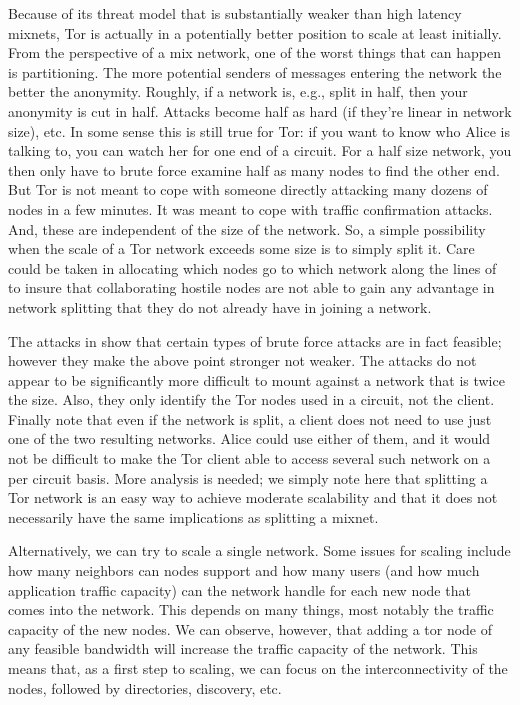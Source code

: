 \documentclass{llncs}
\begin{document}
Because of its threat model that is substantially weaker than high
latency mixnets, Tor is actually in a potentially better position to
scale at least initially. From the perspective of a mix network, one
of the worst things that can happen is partitioning. The more
potential senders of messages entering the network the better the
anonymity.  Roughly, if a network is, e.g., split in half, then your
anonymity is cut in half. Attacks become half as hard (if they're
linear in network size), etc. In some sense this is still true for
Tor: if you want to know who Alice is talking to, you can watch her
for one end of a circuit. For a half size network, you then only have
to brute force examine half as many nodes to find the other end. But
Tor is not meant to cope with someone directly attacking many dozens
of nodes in a few minutes. It was meant to cope with traffic
confirmation attacks. And, these are independent of the size of the
network.  So, a simple possibility when the scale of a Tor network
exceeds some size is to simply split it. Care could be taken in
allocating which nodes go to which network along the lines of
\cite{casc-rep} to insure that collaborating hostile nodes are not
able to gain any advantage in network splitting that they do not
already have in joining a network.

The attacks in \cite{attack-tor-oak05} show that certain types of
brute force attacks are in fact feasible; however they make the
above point stronger not weaker. The attacks do not appear to be
significantly more difficult to mount against a network that is
twice the size. Also, they only identify the Tor nodes used in a
circuit, not the client. Finally note that even if the network is split,
a client does not need to use just one of the two resulting networks.
Alice could use either of them, and it would not be difficult to make
the Tor client able to access several such network on a per circuit
basis. More analysis is needed; we simply note here that splitting
a Tor network is an easy way to achieve moderate scalability and that
it does not necessarily have the same implications as splitting a mixnet.

Alternatively, we can try to scale a single network.  Some issues for
scaling include how many neighbors can nodes support and how many
users (and how much application traffic capacity) can the network
handle for each new node that comes into the network. This depends on
many things, most notably the traffic capacity of the new nodes.  We
can observe, however, that adding a tor node of any feasible bandwidth
will increase the traffic capacity of the network. This means that, as
a first step to scaling, we can focus on the interconnectivity of the
nodes, followed by directories, discovery, etc.
\end{document}

